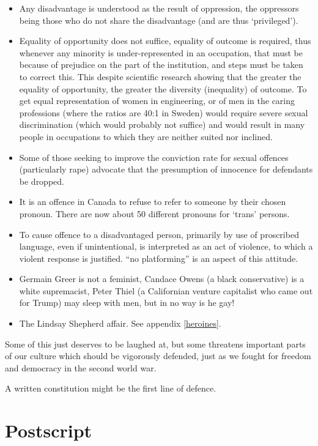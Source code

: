 \documentclass[14pt,titlepage]{extarticle}
\begin{document}
\begin{itemize}
\item Any disadvantage is understood as the result of oppression, the oppressors being those who do not share the disadvantage (and are thus `privileged').
\item Equality of opportunity does not suffice, equality of outcome is required, thus whenever any minority is under-represented in an occupation, that must be because of prejudice on the part of the institution, and steps must be taken to correct this.
  This despite scientific research showing that the greater the equality of opportunity, the greater the diversity (inequality) of outcome.
  To get equal representation of women in engineering, or of men in the caring professions (where the ratios are 40:1 in Sweden) would require severe sexual discrimination (which would probably not suffice) and would result in many people in occupations to which they are neither suited nor inclined.
\item Some of those seeking to improve the conviction rate for sexual offences (particularly rape) advocate that the presumption of innocence for defendants be dropped.
\item It is an offence in Canada to refuse to refer to someone by their chosen pronoun.
  There are now about 50 different pronouns for `trans' persons.
\item To cause offence to a disadvantaged person, primarily by use of proscribed language, even if unintentional, is interpreted as an act of violence, to which a violent response is justified.
  ``no platforming'' is an aspect of this attitude.
\item Germain Greer is not a feminist, Candace Owens (a black conservative) is a white supremacist, Peter Thiel (a Californian venture capitalist who came out for Trump) may sleep with men, but in no way is he gay!
  \item The Lindsay Shepherd affair.  See appendix \ref{heroines}.
  \end{itemize}

Some of this just deserves to be laughed at, but some threatens important parts of our culture which should be vigorously defended, just as we fought for freedom and democracy in the second world war.

A written constitution might be the first line of defence.

\section{Postscript}
\end{document}
